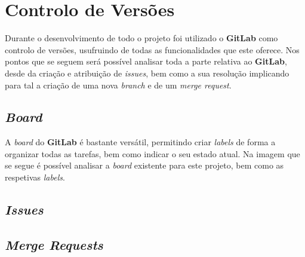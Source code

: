 \chapter{Controlo de Versões}

Durante o desenvolvimento de todo o projeto foi utilizado o \textbf{GitLab} como controlo de versões, usufruindo de todas as funcionalidades que este oferece. Nos pontos que se seguem será possível analisar toda a parte relativa ao \textbf{GitLab}, desde da criação e atribuição de \textit{issues}, bem como a sua resolução implicando para tal a criação de uma nova \textit{branch} e de um \textit{merge request}.

\section{\textit{Board}}

A \textit{board} do \textbf{GitLab} é bastante versátil, permitindo criar \textit{labels} de forma a organizar todas as tarefas, bem como indicar o seu estado atual. Na imagem que se segue é possível analisar a \textit{board} existente para este projeto, bem como as respetivas \textit{labels}.

\section{\textit{Issues}}

\section{\textit{Merge Requests}}